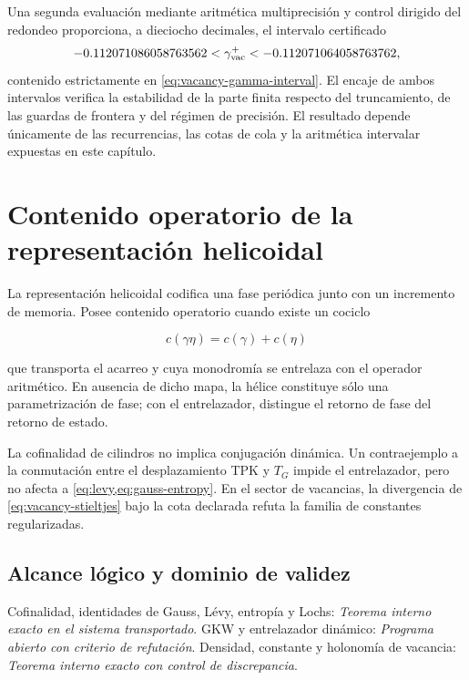 Una segunda evaluación mediante aritmética multiprecisión y control dirigido
del redondeo proporciona, a dieciocho decimales, el intervalo certificado
\[
-0.112071086058763562
<\gamma_{\rm vac}^{+}
<-0.112071064058763762,
\]
contenido estrictamente en \cref{eq:vacancy-gamma-interval}. El encaje de
ambos intervalos verifica la estabilidad de la parte finita respecto del
truncamiento, de las guardas de frontera y del régimen de precisión. El
resultado depende únicamente de las recurrencias, las cotas de cola y la
aritmética intervalar expuestas en este capítulo.

\section{Contenido operatorio de la representaci\'on helicoidal}

La representaci\'on helicoidal codifica una fase peri\'odica junto con un
incremento de memoria. Posee contenido operatorio cuando existe un cociclo

\[
c(\gamma\eta)=c(\gamma)+c(\eta)
\]

que transporta el acarreo y cuya monodrom\'ia se entrelaza con el operador
aritm\'etico. En ausencia de dicho mapa, la h\'elice constituye s\'olo una
parametrizaci\'on de fase; con el entrelazador, distingue el retorno de fase
del retorno de estado.

\begin{remark}
La cofinalidad de cilindros no implica conjugaci\'on din\'amica. Un
contraejemplo a la conmutaci\'on entre el desplazamiento TPK y \(T_G\)
impide el entrelazador, pero no afecta a
\cref{eq:levy,eq:gauss-entropy}. En el sector de vacancias, la divergencia
de \cref{eq:vacancy-stieltjes} bajo la cota declarada refuta la familia de
constantes regularizadas.
\end{remark}

\subsection*{Alcance lógico y dominio de validez}
Cofinalidad, identidades de Gauss, L\'evy, entrop\'ia y Lochs: \emph{Teorema interno exacto en el sistema transportado}. GKW y entrelazador din\'amico: \emph{Programa abierto con criterio de refutación}. Densidad, constante y holonom\'ia de vacancia: \emph{Teorema interno exacto con control de discrepancia}.
